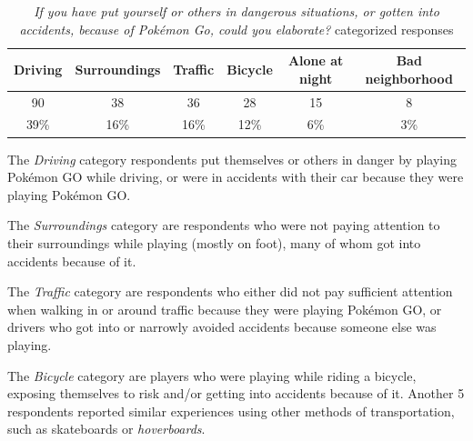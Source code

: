 \begin{table}[h]
	\centering
	\caption{\emph{If you have put yourself or others in dangerous situations, or gotten into accidents, because of Pokémon Go, could you elaborate?} categorized responses}
	\label{tbl:danger-or-accidents-elaboration}
	\begin{tabular}{|c|c|c|c|c|c|}
		\hline
		Driving	& Surroundings	& Traffic	& Bicycle	& Alone at night	& Bad neighborhood\\
		\hline\hline
		90		& 38			& 36		& 28		& 15				& 8\\
		39\%	& 16\%			& 16\%		& 12\%		& 6\%				& 3\%\\\hline
	\end{tabular}
\end{table}

The \emph{Driving} category respondents put themselves or others in danger by playing Pokémon GO while driving, or were in accidents with their car because they were playing Pokémon GO.

The \emph{Surroundings} category are respondents who were not paying attention to their surroundings while playing (mostly on foot), many of whom got into accidents because of it.

The \emph{Traffic} category are respondents who either did not pay sufficient attention when walking in or around traffic because they were playing Pokémon GO, or drivers who got into or narrowly avoided accidents because someone else was playing.

The \emph{Bicycle} category are players who were playing while riding a bicycle, exposing themselves to risk and/or getting into accidents because of it. Another 5 respondents reported similar experiences using other methods of transportation, such as skateboards or \emph{hoverboards}.

